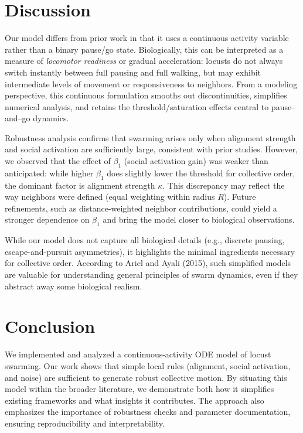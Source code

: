 \documentclass[11pt,a4paper]{article}
\begin{document}
\section{Discussion}

Our model differs from prior work in that it uses a continuous activity variable rather than a binary pause/go state. 
Biologically, this can be interpreted as a measure of \emph{locomotor readiness} or gradual acceleration: locusts do not always switch instantly between full pausing and full walking, but may exhibit intermediate levels of movement or responsiveness to neighbors. 
From a modeling perspective, this continuous formulation smooths out discontinuities, simplifies numerical analysis, and retains the threshold/saturation effects central to pause--and--go dynamics.  

Robustness analysis confirms that swarming arises only when alignment strength and social activation are sufficiently large, consistent with prior studies. 
However, we observed that the effect of $\beta_1$ (social activation gain) was weaker than anticipated: while higher $\beta_1$ does slightly lower the threshold for collective order, the dominant factor is alignment strength $\kappa$. 
This discrepancy may reflect the way neighbors were defined (equal weighting within radius $R$). 
Future refinements, such as distance-weighted neighbor contributions, could yield a stronger dependence on $\beta_1$ and bring the model closer to biological observations.  

While our model does not capture all biological details (e.g., discrete pausing, escape-and-pursuit asymmetries), it highlights the minimal ingredients necessary for collective order. 
According to Ariel and Ayali (2015), such simplified models are valuable for understanding general principles of swarm dynamics, even if they abstract away some biological realism.


\section{Conclusion}

We implemented and analyzed a continuous-activity ODE model of locust swarming. Our work shows that simple local rules (alignment, social activation, and noise) are sufficient to generate robust collective motion. By situating this model within the broader literature, we demonstrate both how it simplifies existing frameworks and what insights it contributes. The approach also emphasizes the importance of robustness checks and parameter documentation, ensuring reproducibility and interpretability.
\end{document}
